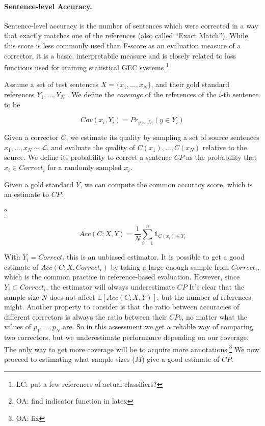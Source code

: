 \documentclass[english]{article}
\newcommand{\oa}[1]{\footnote{\color{red}OA: #1}}
\newcommand{\lc}[1]{\footnote{\color{green}LC: #1}}
\begin{document}
 
\paragraph{Sentence-level Accuracy.}
Sentence-level accuracy is the number of sentences which were corrected in a way that exactly matches one of the
references (also called ``Exact Match''). While this score is less commonly used than F-score as an evaluation
measure of a corrector, it is a basic, interpretabile measure and is closely related to loss functions used for
training statistical GEC systems \cite{rozovskaya2010training,chodorow2012problems}\lc{put a few references of actual classifiers?}. 


Assume a set of test sentences $X=\{x_1,\ldots,x_N\}$,
and their gold standard references $Y_1,\ldots,Y_N$ . We define the
{\it coverage} of the references of the $i$-th sentence to be

\begin{equation}
  Cov(x_i,Y_i)=Pr_{y \sim \mathcal{D}_i}(y \in Y_i)
\end{equation}

Given a corrector $C$, we estimate its quality by sampling a set of source sentences
$x_1,\ldots,x_N \sim \mathcal{L}$, and evaluate the quality of $C(x_1),\ldots,C(x_N)$ relative
to the source. We define its probability to correct a sentence $CP$
as the probability that $x_i \in Correct_i$ for a randomly sampled $x_i$.

Given a gold standard $Y$,  we can compute the common accuracy score, which is an estimate to $CP$:

\oa{find indicator function in latex}

\begin{equation}
  Acc(C;X,Y) = \frac{1}{N} \sum_{i=1}^n \mathds{1}_{C(x_i) \in Y_i}
\end{equation}

With $Y_i=Correct_i$ this is an unbiased estimator. It is possible to get a good estimate of $Acc(C;X,Correct_i)$
by taking a large enough sample from $Correct_i$, which is the common practice in reference-based evaluation. However,
since $Y_i \subset Correct_i$, the estimator will always underestimate $CP$
It's clear that the sample size $N$ does not affect $\mathbb{E}[Acc(C;X,Y)]$, but the number of references
might. Another property to consider is that the ratio between accuracies of different correctors
is always the ratio between their $CP$s, no matter what the values of $p_1,\ldots,p_N$ are.
So in this assessment we get a reliable way of comparing two correctors,
but we underestimate performance depending on our coverage. The only way to get more coverage
will be to acquire more annotations.\oa{fix} 
We now proceed to estimating what sample sizes ($M$) give a good estimate of $CP$.
\end{document}
